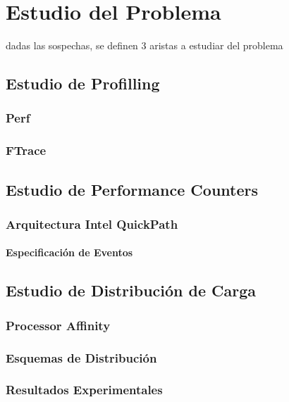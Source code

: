 \chapter{Estudio del Problema}

dadas las sospechas, se definen 3 aristas a estudiar del problema

\section{Estudio de Profilling}
\subsection{Perf}
\subsection{FTrace}


\section{Estudio de Performance Counters}
\subsection{Arquitectura Intel QuickPath}
\subsubsection{Especificación de Eventos}

\section{Estudio de Distribución de Carga}
\subsection{Processor Affinity}
\subsection{Esquemas de Distribución}
\subsection{Resultados Experimentales}